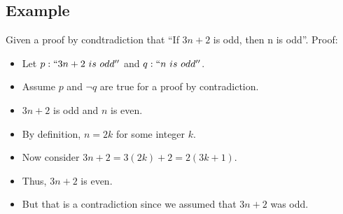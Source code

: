 \documentclass[letterpaper, 12pt]{math}
\begin{document}
\subsection*{Example}
Given a proof by condtradiction that ``If \( 3n+2 \) is odd, then n is odd''.
Proof:
\begin{itemize}
  \item Let \( p: ``3n+2\ is\ odd'' \) and \( q: ``n\ is\ odd'' \).
  \item Assume \( p \) and \( \neg{q} \) are true for a proof by contradiction.
  \item \( 3n+2 \) is odd and \( n \) is even.
  \item By definition, \( n = 2k \) for some integer \( k \).
  \item Now consider \( 3n+2 = 3(2k)+2 = 2(3k+1) \).
  \item Thus, \( 3n+2 \) is even.
  \item But that is a contradiction since we assumed that \( 3n+2 \) was odd.
\end{itemize}
\end{document}
